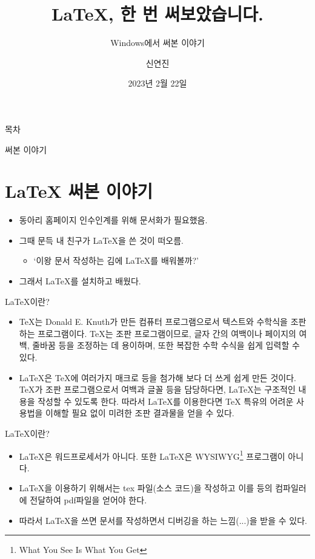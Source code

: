 \documentclass{beamer}
\title{\LaTeX{}, 한 번 써보았습니다.}
\subtitle{Windows에서 \LaTeXe{} 써본 이야기}
\author{신연진}
\date{2023년 2월 22일}
\begin{document}
\frame{\titlepage}

\begin{frame}{목차}
    \tableofcontents[hideallsubsections]
\end{frame}

\begin{frame}{써본 이야기}
    \section{\LaTeX{} 써본 이야기}
    \begin{itemize}
        \item 동아리 홈페이지 인수인계를 위해 문서화가 필요했음.
        \item 그때 문득 내 친구가 \LaTeX{}을 쓴 것이 떠오름.
        \begin{itemize}
            \item `이왕 문서 작성하는 김에 \LaTeX{}를 배워볼까?'
        \end{itemize}
        \item 그래서 \LaTeX{}를 설치하고 배웠다.
    \end{itemize}
\end{frame}

\begin{frame}{\LaTeX{}이란?}
    \begin{itemize}
        \section{\LaTeX{}이란?}
        \item \TeX{}는 Donald E. Knuth가 만든 컴퓨터 프로그램으로서 텍스트와 수학식을 조판하는 프로그램이다. \TeX{}는 조판 프로그램이므로, 글자 간의 여백이나 페이지의 여백, 줄바꿈 등을 조정하는 데 용이하며, 또한 복잡한 수학 수식을 쉽게 입력할 수 있다.

        \item \LaTeX{}은 \TeX{}에 여러가지 매크로 등을 첨가해 보다 더 쓰게 쉽게 만든 것이다. \TeX{}가 조판 프로그램으로서 여백과 글꼴 등을 담당하다면, \LaTeX{}는 구조적인 내용을 작성할 수 있도록 한다. 따라서 \LaTeX{}를 이용한다면 \TeX{} 특유의 어려운 사용법을 이해할 필요 없이 미려한 조판 결과물을 얻을 수 있다.
    \end{itemize}
\end{frame}

\begin{frame}{\LaTeX{}이란?}
    \begin{itemize}
        \item \LaTeX{}은 워드프로세서가 아니다. 또한 \LaTeX{}은 WYSIWYG\footnote{What You See Is What You Get} 프로그램이 아니다.
        \item \LaTeX{}을 이용하기 위해서는 tex 파일(소스 코드)을 작성하고 이를 \XeLaTeX{} 등의 컴파일러에 전달하여 pdf파일을 얻어야 한다.
        \item 따라서 \LaTeX{}을 쓰면 문서를 작성하면서 디버깅을 하는 느낌(...)을 받을 수 있다.
    \end{itemize}
\end{frame}
\end{document}
